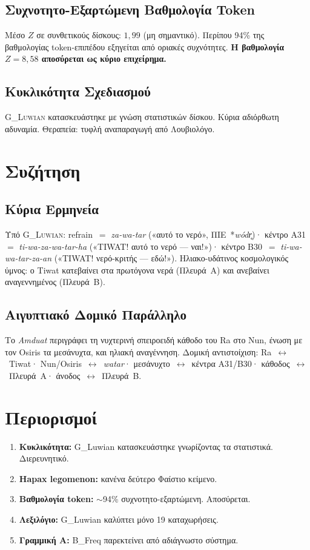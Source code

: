 \documentclass[12pt,a4paper]{article}
\begin{document}
\subsection{Συχνοτητο-Εξαρτώμενη Βαθμολογία Token}
Μέσο $Z$ σε συνθετικούς δίσκους: $1{,}99$ (μη σημαντικό). Περίπου 94\% της βαθμολογίας token-επιπέδου εξηγείται από οριακές συχνότητες. \textbf{Η βαθμολογία $Z=8{,}58$ αποσύρεται ως κύριο επιχείρημα.}

\subsection{Κυκλικότητα Σχεδιασμού}
\textsc{G\_Luwian} κατασκευάστηκε με γνώση στατιστικών δίσκου. Κύρια αδιόρθωτη αδυναμία. Θεραπεία: τυφλή αναπαραγωγή από Λουβιολόγο.

\section{Συζήτηση}

\subsection{Κύρια Ερμηνεία}
Υπό \textsc{G\_Luwian}: refrain~$=$ \textit{za-wa-tar} («αυτό το νερό», ΠΙΕ~*\textit{wódr̥})· κέντρο A31~$=$ \textit{ti-wa-za-wa-tar-ha} («TIWAT! αυτό το νερό --- ναι!»)· κέντρο B30~$=$ \textit{ti-wa-wa-tar-za-an} («TIWAT! νερό-κριτής --- εδώ!»). Ηλιακο-υδάτινος κοσμολογικός ύμνος: ο Tiwat κατεβαίνει στα πρωτόγονα νερά (Πλευρά~Α) και ανεβαίνει αναγεννημένος (Πλευρά~Β).

\subsection{Αιγυπτιακό Δομικό Παράλληλο}
Το \textit{Amduat} περιγράφει τη νυχτερινή σπειροειδή κάθοδο του Ra στο Nun, ένωση με τον Osiris τα μεσάνυχτα, και ηλιακή αναγέννηση. Δομική αντιστοίχιση: Ra~$\leftrightarrow$~Tiwat· Nun/Osiris~$\leftrightarrow$~\textit{watar}· μεσάνυχτο~$\leftrightarrow$~κέντρα A31/B30· κάθοδος~$\leftrightarrow$~Πλευρά~Α· άνοδος~$\leftrightarrow$~Πλευρά~Β.

\section{Περιορισμοί}
\begin{enumerate}
  \item \textbf{Κυκλικότητα:} G\_Luwian κατασκευάστηκε γνωρίζοντας τα στατιστικά. Διερευνητικό.
  \item \textbf{Hapax legomenon:} κανένα δεύτερο Φαίστιο κείμενο.
  \item \textbf{Βαθμολογία token:} $\sim$94\% συχνοτητο-εξαρτώμενη. Αποσύρεται.
  \item \textbf{Λεξιλόγιο:} G\_Luwian καλύπτει μόνο 19 καταχωρήσεις.
  \item \textbf{Γραμμική Α:} B\_Freq παρεκτείνει από αδιάγνωστο σύστημα.
\end{enumerate}
\end{document}

